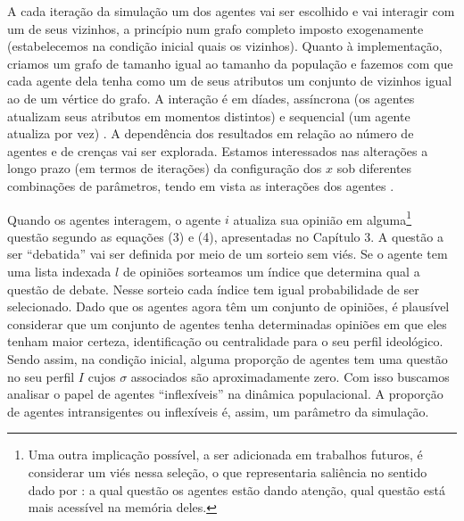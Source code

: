 A cada iteração da simulação um dos agentes vai ser escolhido e vai interagir
com um de seus vizinhos, a princípio num grafo completo imposto exogenamente
(estabelecemos na condição inicial quais os vizinhos). Quanto à implementação,
criamos um grafo de tamanho igual ao tamanho da população e fazemos com que cada
agente dela tenha como um de seus atributos um conjunto de vizinhos igual ao de
um vértice do grafo. A interação é em díades, assíncrona (os agentes atualizam
seus atributos em momentos distintos) e sequencial (um agente atualiza por vez)
\cite{wilensky2015introduction}. A dependência dos resultados em relação ao
número de agentes e de crenças vai ser explorada. Estamos interessados nas
alterações a longo prazo (em termos de iterações) da configuração dos \(x\) sob
diferentes combinações de parâmetros, tendo em vista as interações dos agentes
\cite{acemoglu2011opinion}.

Quando os agentes interagem, o agente \(i\) atualiza sua opinião em
alguma\footnote{ Uma outra implicação possível, a ser adicionada em trabalhos
  futuros, é considerar um viés nessa seleção, o que representaria saliência no
  sentido dado por : a qual questão os agentes
  estão dando atenção, qual questão está mais acessível na memória deles.}
questão segundo as equações (3) e (4), apresentadas no Capítulo 3. A questão a
ser ``debatida'' vai ser definida por meio de um sorteio sem viés. Se o agente
tem uma lista indexada \(l\) de opiniões sorteamos um índice que determina qual
a questão de debate. Nesse sorteio cada índice tem igual probabilidade de ser
selecionado. Dado que os agentes agora têm um conjunto de opiniões, é plausível
considerar que um conjunto de agentes tenha determinadas opiniões em que eles
tenham maior certeza, identificação ou centralidade para o seu perfil
ideológico. Sendo assim, na condição inicial, alguma proporção de agentes tem
uma questão no seu perfil \(I\) cujos \(\sigma\) associados são aproximadamente
zero. Com isso buscamos analisar o papel de agentes ``inflexíveis'' na dinâmica
populacional. A proporção de agentes intransigentes ou inflexíveis é, assim, um
parâmetro da simulação.

